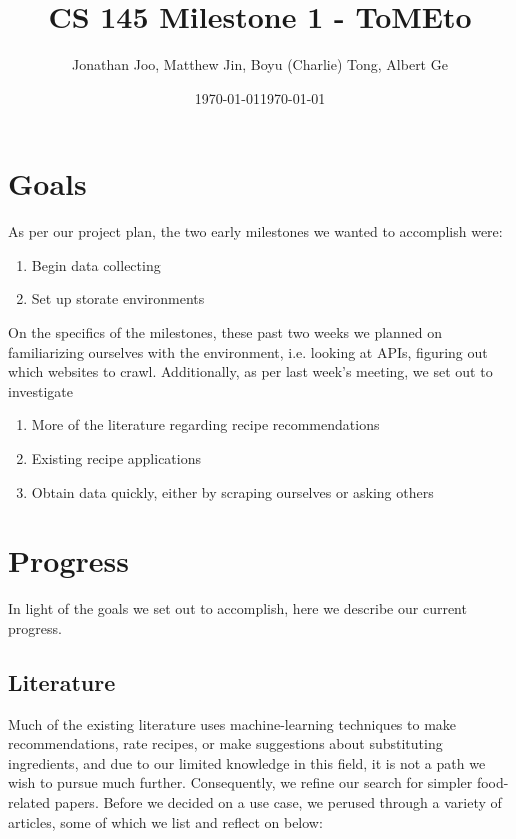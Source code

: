 \documentclass{article}
\date{\today}
\title{CS 145 Milestone 1 - ToMEto}
\author{Jonathan Joo, Matthew Jin, Boyu (Charlie) Tong, Albert Ge}
\date{\today} \\
\begin{document}
\maketitle

\section{Goals}
As per our project plan, the two early milestones we wanted to accomplish were:
\begin{enumerate}
    \item Begin data collecting
    \item Set up storate environments
\end{enumerate}

On the specifics of the milestones, these past two weeks we planned on familiarizing ourselves with the environment, i.e. 
looking at APIs, figuring out which websites to crawl. Additionally, as per last week's meeting, we set out to investigate
\begin{enumerate}
    \item More of the literature regarding recipe recommendations
    \item Existing recipe applications 
    \item Obtain data quickly, either by scraping ourselves or asking others 
\end{enumerate}

\section{Progress}
In light of the goals we set out to accomplish, here we describe our current progress.
\subsection{Literature}

Much of the existing literature uses machine-learning techniques to make 
recommendations, rate recipes, or make suggestions about substituting ingredients, and due to our limited knowledge
in this field, it is not a path we wish to pursue much further. Consequently, we refine our search for simpler
food-related papers. Before we decided on a use case, we perused through a variety of articles, some of which
we list and reflect on below: \\
\end{document}

